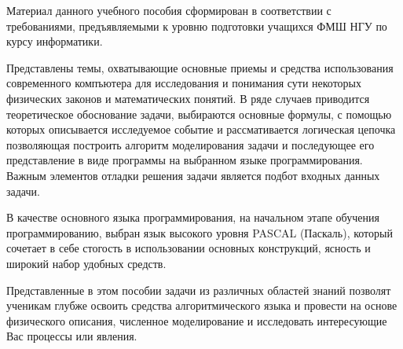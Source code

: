 Материал данного учебного пособия сформирован в соответствии с требованиями, предъявляемыми к уровню подготовки учащихся ФМШ НГУ по курсу информатики. 

Представлены темы, охватывающие основные приемы и средства использования современного компъютера для исследования и понимания сути некоторых физических законов и математических понятий. В ряде случаев приводится теоретическое обоснование задачи, выбираются основные формулы, с помощью которых описывается исследуемое событие и рассмативается логическая цепочка позволяющая построить алгоритм моделирования задачи и последующее его представление в виде программы на выбранном языке программирования. Важным элементов отладки решения задачи является подбот входных данных задачи.

В качестве основного языка программирования, на начальном этапе обучения  программированию,  выбран  язык высокого уровня PASCAL (Паскаль), который сочетает в   себе стогость в использовании основных конструкций, ясность и широкий набор удобных средств.


Представленные в этом пособии задачи из различных областей знаний позволят ученикам глубже освоить средства алгоритмического языка и провести на основе физического описания, численное моделирование и исследовать интересующие Вас процессы или явления. 


